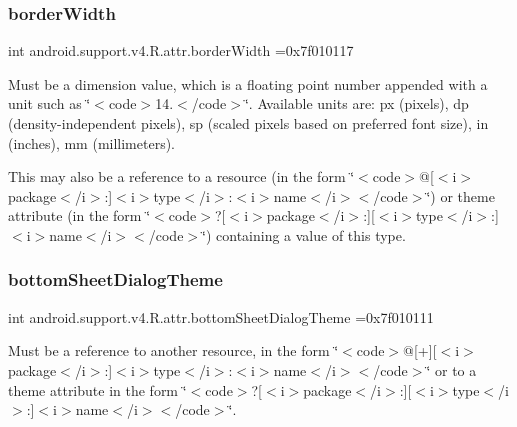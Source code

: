 \subsubsection{\texorpdfstring{border\+Width}{borderWidth}}
{\footnotesize\ttfamily int android.\+support.\+v4.\+R.\+attr.\+border\+Width =0x7f010117\hspace{0.3cm}{\ttfamily [static]}}

Must be a dimension value, which is a floating point number appended with a unit such as \char`\"{}$<$code$>$14.\+5sp$<$/code$>$\char`\"{}. Available units are\+: px (pixels), dp (density-\/independent pixels), sp (scaled pixels based on preferred font size), in (inches), mm (millimeters). 

This may also be a reference to a resource (in the form \char`\"{}$<$code$>$@\mbox{[}$<$i$>$package$<$/i$>$\+:\mbox{]}$<$i$>$type$<$/i$>$\+:$<$i$>$name$<$/i$>$$<$/code$>$\char`\"{}) or theme attribute (in the form \char`\"{}$<$code$>$?\mbox{[}$<$i$>$package$<$/i$>$\+:\mbox{]}\mbox{[}$<$i$>$type$<$/i$>$\+:\mbox{]}$<$i$>$name$<$/i$>$$<$/code$>$\char`\"{}) containing a value of this type. \mbox{\label{classandroid_1_1support_1_1v4_1_1R_1_1attr_a5d2141f05a94ea6df7aa87c76d4c1613}} 
\subsubsection{\texorpdfstring{bottom\+Sheet\+Dialog\+Theme}{bottomSheetDialogTheme}}
{\footnotesize\ttfamily int android.\+support.\+v4.\+R.\+attr.\+bottom\+Sheet\+Dialog\+Theme =0x7f010111\hspace{0.3cm}{\ttfamily [static]}}

Must be a reference to another resource, in the form \char`\"{}$<$code$>$@\mbox{[}+\mbox{]}\mbox{[}$<$i$>$package$<$/i$>$\+:\mbox{]}$<$i$>$type$<$/i$>$\+:$<$i$>$name$<$/i$>$$<$/code$>$\char`\"{} or to a theme attribute in the form \char`\"{}$<$code$>$?\mbox{[}$<$i$>$package$<$/i$>$\+:\mbox{]}\mbox{[}$<$i$>$type$<$/i$>$\+:\mbox{]}$<$i$>$name$<$/i$>$$<$/code$>$\char`\"{}. \mbox{\label{classandroid_1_1support_1_1v4_1_1R_1_1attr_a669cde3e095c7754856eca842274e111}} 

